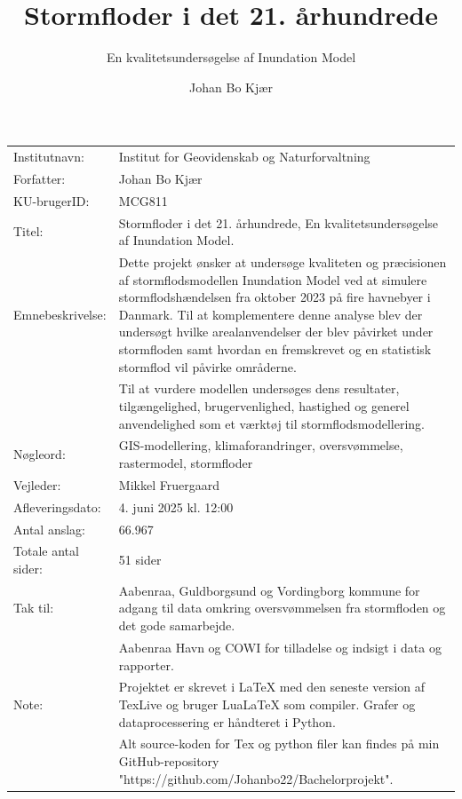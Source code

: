 \documentclass[12pt]{article}
\author{Johan Bo Kjær}
\title{Stormfloder i det 21. århundrede}
\subtitle{En kvalitetsundersøgelse af Inundation Model}
\begin{document}
\maketitle


\onehalfspacing


\begin{table}[h]
\def\arraystretch{1.5}
\begin{tabularx}{\textwidth}{l X}
Institutnavn: & {Institut for Geovidenskab og Naturforvaltning}  \\
Forfatter: & {Johan Bo Kjær} \\
KU-brugerID: & {MCG811} \\
Titel: & {Stormfloder i det 21. århundrede, En kvalitetsundersøgelse af Inundation Model.} \\
Emnebeskrivelse: & Dette projekt ønsker at undersøge kvaliteten og præcisionen af stormflodsmodellen Inundation Model ved at simulere stormflodshændelsen fra oktober 2023 på fire havnebyer i Danmark. Til at komplementere denne analyse blev der undersøgt hvilke arealanvendelser der blev påvirket under stormfloden samt hvordan en fremskrevet og en statistisk stormflod vil påvirke områderne.\\
& Til at vurdere modellen undersøges dens resultater, tilgængelighed, brugervenlighed, hastighed og generel anvendelighed som et værktøj til stormflodsmodellering.\\  
Nøgleord: & GIS-modellering, klimaforandringer, oversvømmelse, rastermodel, stormfloder \\
Vejleder: & Mikkel Fruergaard \\
Afleveringsdato: & 4. juni 2025 kl. 12:00 \\
Antal anslag: & 66.967 \\
Totale antal sider: & 51 sider \\
Tak til: & Aabenraa, Guldborgsund og Vordingborg kommune for adgang til data omkring oversvømmelsen fra stormfloden og det gode samarbejde.\\
& Aabenraa Havn og COWI for tilladelse og indsigt i data og rapporter. \\
Note: & Projektet er skrevet i LaTeX med den seneste version af TexLive og bruger LuaLaTeX som compiler. Grafer og dataprocessering er håndteret i Python.\\
& Alt source-koden for Tex og python filer kan findes på min GitHub-repository "https://github.com/Johanbo22/Bachelorprojekt". 
\end{tabularx} 
\end{table}
\end{document}
